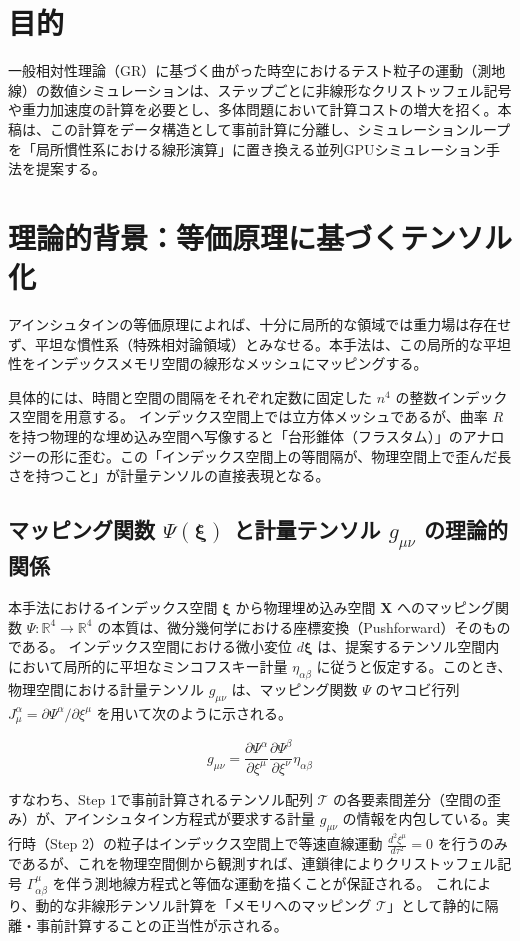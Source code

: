 \documentclass[11pt]{ltjsarticle}
\begin{document}
\section{目的}
一般相対性理論（GR）に基づく曲がった時空におけるテスト粒子の運動（測地線）の数値シミュレーションは、ステップごとに非線形なクリストッフェル記号や重力加速度の計算を必要とし、多体問題において計算コストの増大を招く。本稿は、この計算をデータ構造として事前計算に分離し、シミュレーションループを「局所慣性系における線形演算」に置き換える並列GPUシミュレーション手法を提案する。

\section{理論的背景：等価原理に基づくテンソル化}
アインシュタインの等価原理によれば、十分に局所的な領域では重力場は存在せず、平坦な慣性系（特殊相対論領域）とみなせる。本手法は、この局所的な平坦性をインデックスメモリ空間の線形なメッシュにマッピングする。

具体的には、時間と空間の間隔をそれぞれ定数に固定した $n^4$ の整数インデックス空間を用意する。
インデックス空間上では立方体メッシュであるが、曲率 $R$ を持つ物理的な埋め込み空間へ写像すると「台形錐体（フラスタム）」のアナロジーの形に歪む。この「インデックス空間上の等間隔が、物理空間上で歪んだ長さを持つこと」が計量テンソルの直接表現となる。

\subsection{マッピング関数 $\Psi(\boldsymbol{\xi})$ と計量テンソル $g_{\mu\nu}$ の理論的関係}
本手法におけるインデックス空間 $\boldsymbol{\xi}$ から物理埋め込み空間 $\mathbf{X}$ へのマッピング関数 $\Psi: \mathbb{R}^4 \to \mathbb{R}^4$ の本質は、微分幾何学における座標変換（Pushforward）そのものである。
インデックス空間における微小変位 $d\boldsymbol{\xi}$ は、提案するテンソル空間内において局所的に平坦なミンコフスキー計量 $\eta_{\alpha\beta}$ に従うと仮定する。このとき、物理空間における計量テンソル $g_{\mu\nu}$ は、マッピング関数 $\Psi$ のヤコビ行列 $J^\alpha_\mu = \partial \Psi^\alpha / \partial \xi^\mu$ を用いて次のように示される。

\[ g_{\mu\nu} = \frac{\partial \Psi^\alpha}{\partial \xi^\mu} \frac{\partial \Psi^\beta}{\partial \xi^\nu} \eta_{\alpha\beta} \]

すなわち、Step 1で事前計算されるテンソル配列 $\mathcal{T}$ の各要素間差分（空間の歪み）が、アインシュタイン方程式が要求する計量 $g_{\mu\nu}$ の情報を内包している。実行時（Step 2）の粒子はインデックス空間上で等速直線運動 $\frac{d^2 \xi^\mu}{d\tau^2} = 0$ を行うのみであるが、これを物理空間側から観測すれば、連鎖律によりクリストッフェル記号 $\Gamma^\mu_{\alpha\beta}$ を伴う測地線方程式と等価な運動を描くことが保証される。
これにより、動的な非線形テンソル計算を「メモリへのマッピング $\mathcal{T}$」として静的に隔離・事前計算することの正当性が示される。
\end{document}
